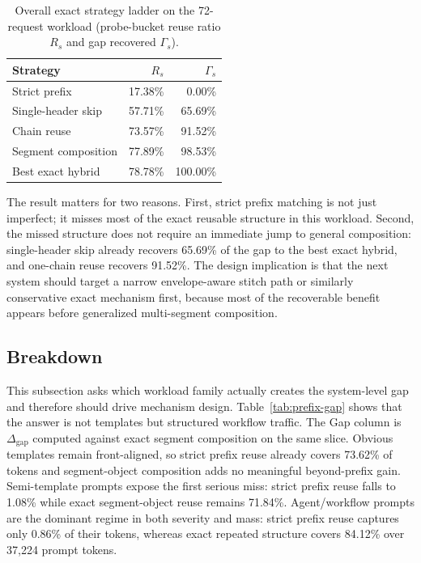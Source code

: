 \documentclass[conference]{IEEEtran}
\begin{document}
\begin{table}[t]
\caption{Overall exact strategy ladder on the 72-request workload (probe-bucket reuse ratio $R_s$ and gap recovered $\Gamma_s$).}
\label{tab:exact-ladder}
\centering
\footnotesize
\setlength{\tabcolsep}{3pt}
\begin{tabular}{@{}lrr@{}}
\toprule
Strategy & $R_s$ & $\Gamma_s$ \\
\midrule
Strict prefix & 17.38\% & 0.00\% \\
Single-header skip & 57.71\% & 65.69\% \\
Chain reuse & 73.57\% & 91.52\% \\
Segment composition & 77.89\% & 98.53\% \\
Best exact hybrid & 78.78\% & 100.00\% \\
\bottomrule
\end{tabular}
\end{table}

The result matters for two reasons. First, strict prefix matching is not just imperfect; it misses most of the exact reusable structure in this workload. Second, the missed structure does not require an immediate jump to general composition: single-header skip already recovers 65.69\% of the gap to the best exact hybrid, and one-chain reuse recovers 91.52\%. The design implication is that the next system should target a narrow envelope-aware stitch path or similarly conservative exact mechanism first, because most of the recoverable benefit appears before generalized multi-segment composition.

\subsection{Breakdown}

This subsection asks which workload family actually creates the system-level gap and therefore should drive mechanism design. Table~\ref{tab:prefix-gap} shows that the answer is not templates but structured workflow traffic. The Gap column is $\Delta_{\text{gap}}$ computed against exact segment composition on the same slice. Obvious templates remain front-aligned, so strict prefix reuse already covers 73.62\% of tokens and segment-object composition adds no meaningful beyond-prefix gain. Semi-template prompts expose the first serious miss: strict prefix reuse falls to 1.08\% while exact segment-object reuse remains 71.84\%. Agent/workflow prompts are the dominant regime in both severity and mass: strict prefix reuse captures only 0.86\% of their tokens, whereas exact repeated structure covers 84.12\% over 37{,}224 prompt tokens.
\end{document}
